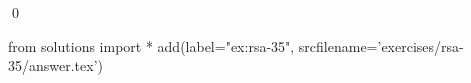 
\begin{ex} 
  \label{ex:rsa-35}
  
  \qed
\end{ex} 
\begin{python0}
from solutions import *
add(label="ex:rsa-35",
    srcfilename='exercises/rsa-35/answer.tex') 
\end{python0}
